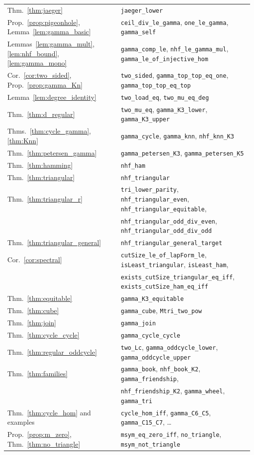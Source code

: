 \documentclass{article}
\theoremstyle{definition}
\newcommand{\lean}[1]{\texttt{#1}}
\begin{document}
\begin{table}[ht]
\begin{tabular}{ll}
Thm.~\ref{thm:jaeger} & \lean{jaeger\_lower} \\
Prop.~\ref{prop:pigeonhole}, Lemma~\ref{lem:gamma_basic} & \lean{ceil\_div\_le\_gamma}, \lean{one\_le\_gamma}, \lean{gamma\_self} \\
Lemmas~\ref{lem:gamma_mult}, \ref{lem:nhf_bound}, \ref{lem:gamma_mono} & \lean{gamma\_comp\_le}, \lean{nhf\_le\_gamma\_mul}, \lean{gamma\_le\_of\_injective\_hom} \\
Cor.~\ref{cor:two_sided}, Prop.~\ref{prop:gamma_Kn} & \lean{two\_sided}, \lean{gamma\_top\_top\_eq\_one}, \lean{gamma\_top\_top\_eq\_top} \\
Lemma~\ref{lem:degree_identity} & \lean{two\_load\_eq}, \lean{two\_mu\_eq\_deg} \\
Thm.~\ref{thm:d_regular} & \lean{two\_mu\_eq}, \lean{gamma\_K3\_lower}, \lean{gamma\_K3\_upper} \\
Thms.~\ref{thm:cycle_gamma}, \ref{thm:Knn} & \lean{gamma\_cycle}, \lean{gamma\_knn}, \lean{nhf\_knn\_K3} \\
Thm.~\ref{thm:petersen_gamma} & \lean{gamma\_petersen\_K3}, \lean{gamma\_petersen\_K5} \\
Thm.~\ref{thm:hamming} & \lean{nhf\_ham} \\
Thm.~\ref{thm:triangular} & \lean{nhf\_triangular} \\
Thm.~\ref{thm:triangular_r} & \lean{tri\_lower\_parity}, \lean{nhf\_triangular\_even}, \lean{nhf\_triangular\_equitable}, \\
 & \lean{nhf\_triangular\_odd\_div\_even}, \lean{nhf\_triangular\_odd\_div\_odd} \\
Thm.~\ref{thm:triangular_general} & \lean{nhf\_triangular\_general\_target} \\
Cor.~\ref{cor:spectral} & \lean{cutSize\_le\_of\_lapForm\_le}, \lean{isLeast\_triangular}, \lean{isLeast\_ham}, \\
 & \lean{exists\_cutSize\_triangular\_eq\_iff}, \lean{exists\_cutSize\_ham\_eq\_iff} \\
Thm.~\ref{thm:equitable} & \lean{gamma\_K3\_equitable} \\
Thm.~\ref{thm:cube} & \lean{gamma\_cube}, \lean{Mtri\_two\_pow} \\
Thm.~\ref{thm:join} & \lean{gamma\_join} \\
Thm.~\ref{thm:cycle_cycle} & \lean{gamma\_cycle\_cycle} \\
Thm.~\ref{thm:regular_oddcycle} & \lean{two\_Lc}, \lean{gamma\_oddcycle\_lower}, \lean{gamma\_oddcycle\_upper} \\
Thm.~\ref{thm:families} & \lean{gamma\_book}, \lean{nhf\_book\_K2}, \lean{gamma\_friendship}, \\
 & \lean{nhf\_friendship\_K2}, \lean{gamma\_wheel}, \lean{gamma\_tri} \\
Thm.~\ref{thm:cycle_hom} and examples & \lean{cycle\_hom\_iff}, \lean{gamma\_C6\_C5}, \lean{gamma\_C15\_C7}, \dots \\
Prop.~\ref{prop:m_zero}, Thm.~\ref{thm:no_triangle} & \lean{msym\_eq\_zero\_iff}, \lean{no\_triangle}, \lean{msym\_not\_triangle} \\
\bottomrule
\end{tabular}
\end{table}
\end{document}
